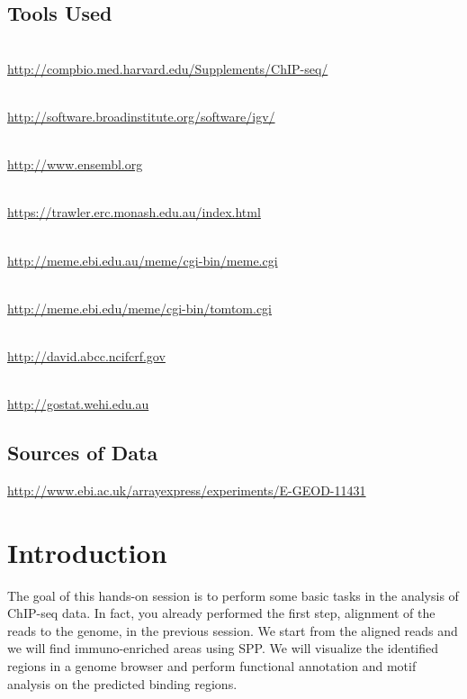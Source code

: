 \subsection{Tools Used}
\begin{description}[style=multiline,labelindent=0cm,align=left,leftmargin=0.5cm]
  \item[SPP]\hfill\\
  	\url{http://compbio.med.harvard.edu/Supplements/ChIP-seq/}
	\item[IGV]\hfill\\
		\url{http://software.broadinstitute.org/software/igv/}
  \item[Ensembl]\hfill\\
  	\url{http://www.ensembl.org}
	\item[Trawler]\hfill\\
  	\url{https://trawler.erc.monash.edu.au/index.html}
  \item[MEME]\hfill\\
  	\url{http://meme.ebi.edu.au/meme/cgi-bin/meme.cgi}
  \item[TOMTOM]\hfill\\
  	\url{http://meme.ebi.edu/meme/cgi-bin/tomtom.cgi}  
  \item[DAVID]\hfill\\
  	\url{http://david.abcc.ncifcrf.gov}
  \item[GOstat]\hfill\\
    \url{http://gostat.wehi.edu.au}
\end{description}

\subsection{Sources of Data}
  \url{http://www.ebi.ac.uk/arrayexpress/experiments/E-GEOD-11431}


\newpage

\section{Introduction}

The goal of this hands-on session is to perform some basic tasks in the analysis
of ChIP-seq data. In fact, you already performed the first step, alignment of
the reads to the genome, in the previous session. We start from the aligned
reads and we will find immuno-enriched areas using SPP. We will
visualize the identified regions in a genome browser and perform functional
annotation and motif analysis on the predicted binding regions.


